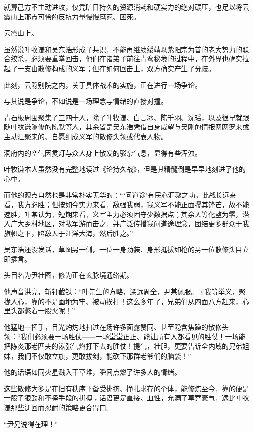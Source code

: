 就算己方不主动进攻，仅凭旷日持久的资源消耗和硬实力的绝对碾压，也足以将云霞山上那点可怜的反抗力量慢慢磨死、困死。

\vspace{2em}

云霞山上。

虽然说叶牧谦和吴东浩形成了共识，不能再继续绥靖以紫阳宗为首的老大势力的联合绞杀，必须要重拳回击，他们在诸弟子前往青鸾秘境的过程中，在外界也确实拉起了一支由散修构成的义军；但在如何回击上，双方确实产生了分歧。

此刻，云隐别院之内，关于具体战术的实施，正在进行一场争论。

与其说是争论，不如说是一场理念与情绪的直接对撞。

青石板周围聚集了三四十人，除了叶牧谦、白言冰、陈千羽、沈瑶，以及很早就跟随叶牧谦随修的陈默等人，其余皆是吴东浩凭借自身威望与吴刚的情报网网罗来或主动汇聚来的、自愿组成义军的散修头领或代表人物。

洞府内的空气因灵灯与众人身上散发的驳杂气息，显得有些浑浊。

叶牧谦本人虽然没有完整地读过《论持久战》，但是其精髓倒是早早地刻进了他的心中。

而他的观点自然也是非常朴实无华的：“‘问道途’有民心汇聚之功，此战长远来看，我方必胜；但按如今实力来看，敌强我弱，我义军不能正面撄其锋芒，故不能速胜。叶某认为，短期来看，义军主力必须固守少数据点；其余人等化整为零，潜入广大乡村地区，对敌军游而击之，并广泛传播我问道途理念，团结更多群众于我旗帜之下，陷敌人于汪洋大海，然后胜之。”

吴东浩还没发话，草图另一侧，一位一身劲装、身形挺拔如枪的另一位散修头目立即插言。

头目名为尹壮图，修为正在玄脉境通络期。

他声音洪亮，斩钉截铁：“叶先生的方略，深远周全，尹某佩服。可我等举义，聚拢人心，靠的不是画地为牢、被动挨打！这么多年了，兄弟们从四面八方赶来，心里头都憋着一股火呢！”

他猛地一挥手，目光灼灼地扫过在场许多面露赞同、甚至隐含焦躁的散修头领：“我们必须要一场胜仗——一场堂堂正正、能让所有人都看见的胜仗！一场能把陈炎那老匹夫的嚣张气焰打下去的胜仗！提气，壮胆，更要告诉全内域的兄弟姐妹，我们不仅敢立旗，更敢拔剑，能砍下那群老爷们的脑袋！”

他的话语如同火星溅入干草堆，瞬间点燃了许多人的情绪。

这些散修大多是在旧有秩序下备受排挤、挣扎求存的个体，能修炼至今，靠的便是一股子狠劲和不择手段的拼搏；话语更是直接、血性，充满了草莽豪气，远比叶牧谦那些迂回而忍耐的策略更合胃口。

“尹兄说得在理！”

